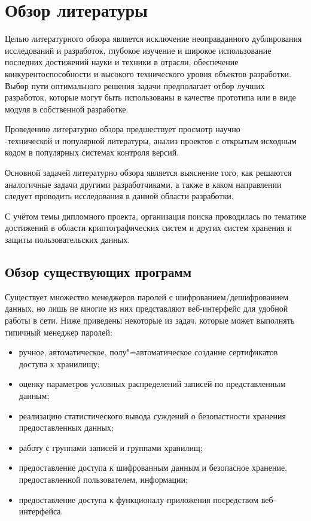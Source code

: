 \section{Обзор литературы}
\label{sec:descript}

Целью литературного обзора является исключение неоправданного дублирования исследований и разработок, глубокое изучение и широкое использование последних достижений науки и техники в отрасли, обеспечение конкурентоспособности и высокого технического уровня объектов разработки.
Выбор пути оптимального решения задачи предполагает отбор лучших разработок, которые могут быть использованы в качестве прото­типа или в виде модуля в собственной разработке.

Проведению литературно обзора предшествует просмотр научно\\-технической и популярной литературы, анализ проектов с открытым исходным кодом в популярных системах контроля версий.

Основной задачей литературно обзора является выяснение того, как решаются аналогичные задачи другими разработчиками, а также в каком направлении следует проводить исследования в данной области разработки.

С учётом темы дипломного проекта, организация поиска проводилась по тематике достижений в области криптографических систем и других систем хранения и защиты пользовательских данных.

\subsection{Обзор существующих программ} %
\label{sub:descript:existing_programs}

Существует множество менеджеров паролей с шифрованием/дешифрованием данных, но лишь не многие из них представляют веб-интерфейс для удобной работы в сети.
Ниже приведены некоторые из задач, которые может выполнять типичный менеджер паролей:
\begin{itemize}
  \item ручное, автоматическое, полу"=автоматическое создание сертификатов доступа к хранилищу;
  \item оценку параметров условных распределений записей по представленным данным;
  \item реализацию статистического вывода суждений о безопастности хранения предоставленных данных;
  \item работу с группами записей и группами хранилищ;
  \item предоставление доступа к шифрованным данным и безопасное хранение, предоставленной пользователем, информации;
  \item предоставление доступа к функционалу приложения посредством веб-интерфейса.
\end{itemize}

